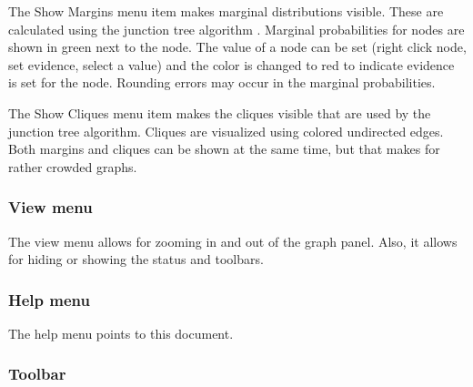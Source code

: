 \documentclass[a4paper]{article}
\begin{document}
The Show Margins menu item makes marginal distributions visible.
These are calculated using the junction tree algorithm \cite{lauritzen}.
Marginal probabilities for nodes are shown in green next to the node.
The value of a node can be set (right click node, set evidence, select
a value) and the color is changed to red to indicate evidence is set
for the node. Rounding errors may occur in the marginal probabilities.

\begin{center}
\end{center}


The Show Cliques menu item makes the cliques visible that are used
by the junction tree algorithm. Cliques are visualized using colored
undirected edges. Both margins and cliques can be shown at the same time,
but that makes for rather crowded graphs.

\begin{center}
\end{center}


\subsubsection*{View menu}
The view menu allows for zooming in and out of the graph panel.
Also, it allows for hiding or showing the status and toolbars.

\begin{center}
\end{center}

\subsubsection*{Help menu}

The help menu points to this document.

\begin{center}
\end{center}


\subsubsection*{Toolbar}

\begin{center}
\end{center}
\end{document}
